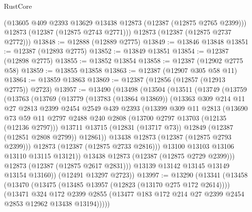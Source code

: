 \begin{lexlean}{RustCore}
\begin{coremodule}
        (@13605 @409 @2393 @13629 @13438 @12873 (@12387 (@12875 @2765 @2399)))
        @12873
        (@12387 (@12875 @2743 @2771)))
      @12873
      (@12387 (@12875 @2737 @2772)))
@13848 := @12888 (@12889 @2775)
@13849 := @13846 @13848
@13851 := @12387 (@12893 @2775)
@13852 := @13849 @13851
@13854 := @12387 (@12898 @2775)
@13855 := @13852 @13854
@13858 := @12387 (@12902 @2775 @58)
@13859 := @13855 @13858
@13863 := @12387 (@12907 @305 @58 @11)
@13864 := @13859 @13863
@13869 := @12387 (@12856 (@12857 (@12913 @2775)) @2723)
@13957 := @13490
    (@13498
      (@13504
        (@13511
          (@13749
            (@13759
              (@13763
                (@13769
                  (@13779
                    (@13783 (@13864 @13869))
                    (@13363
                      @309
                      @214
                      @11
                      @27
                      @2813
                      @2399
                      @2454
                      @2549
                      @439
                      @2393
                      (@13399
                        @309
                        @11
                        @2813
                        (@13690
                          @73
                          @59
                          @11
                          @2797
                          @2488
                          @240
                          @2808
                          (@13700 @2797 @13703 (@12135 (@12136 @2797)))
                          @13711
                          @13715
                          (@12831 (@13717 @73))
                          @12849
                          (@12387 (@12851 @2808 @2799))
                          @12861))
                      @13438
                      @12873
                      (@12387 (@12875 @2793 @2399)))
                    @12873
                    (@12387 (@12875 @2733 @2816)))
                  @13100
                  @13103
                  @13106
                  @13110
                  @13115
                  @13121))
              @13438
              @12873
              (@12387 (@12875 @2729 @2399)))
            @12873
            (@12387 (@12875 @2617 @2831)))
          @13139
          @13142
          @13145
          @13149
          @13154
          @13160))
      (@12491 @13297 @2723))
@13997 := @13290
    (@13341
      (@13458
        (@13470
          (@13475 (@13485 @13957 (@12823 (@13170 @275 @172 @2614))))
          (@13471
            @324
            @172
            @2399
            @2855
            (@13477 @183 @172 @214 @27 @2399 @2454 @2853 @12962 @13438 @13194)))))

\end{coremodule}
\end{lexlean}
